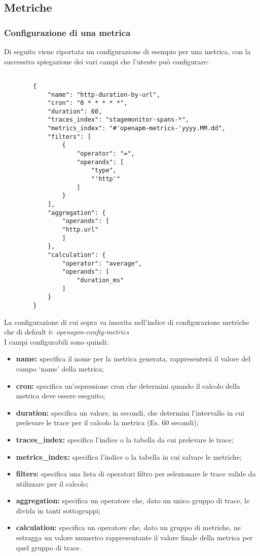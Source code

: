 \subsection{Metriche}

	\subsubsection{Configurazione di una metrica}

	Di seguito viene riportata un configurazione di esempio per una metrica, con la successiva spiegazione dei vari campi che l'utente può configurare:

	\begin{lstlisting}[style=json]

		{
			"name": "http-duration-by-url",
			"cron": "0 * * * * *",
			"duration": 60,
			"traces_index": "stagemonitor-spans-*",
			"metrics_index": "#'openapm-metrics-'yyyy.MM.dd",
			"filters": [
				{
					"operator": "=",
					"operands": [
						"type",
						"'http'"
					]
				}
			],
			"aggregation": {
				"operands": [
				"http.url"
				]
			},
			"calculation": {
				"operator": "average",
				"operands": [
					"duration_ms"
				]
			}
		}
	\end{lstlisting}

	La configurazione di cui sopra va inserita nell'indice di configurazione metriche che di default è: \textit{openapm-config-metrics} \\
	I campi configurabili sono quindi:

	\begin{itemize}
                \item \textbf{name:} specifica il nome per la metrica generata, rappresenterà il valore del campo `name' della metrica;
                \item \textbf{cron:} specifica un'espressione cron che determini quando il calcolo della metrica deve essere eseguito;
                \item \textbf{duration:} specifica un valore, in secondi, che determini l'intervallo in cui prelevare le trace per il calcolo la metrica (Es. 60 secondi);
                \item \textbf{traces\_index:} specifica l'indice o la tabella da cui prelevare le trace;
                \item \textbf{metrics\_index:} specifica l'indice o la tabella in cui salvare le metriche;
                \item \textbf{filters:} specifica una lista di operatori filtro per selezionare le trace valide da utilizzare per il calcolo;
                \item \textbf{aggregation:} specifica un operatore che, dato un unico gruppo di trace, le divida in tanti sottogruppi;
                \item \textbf{calculation:} specifica un operatore che, dato un gruppo di metriche, ne estragga un valore numerico rappresentante il valore finale della metrica per quel gruppo di trace.
	\end{itemize}
